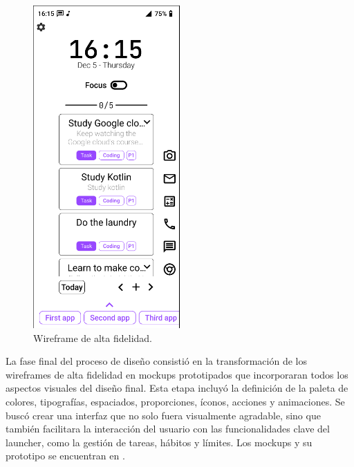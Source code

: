\begin{figure}[H]
  \caption{Wireframe de alta fidelidad.}
  \label{fig:wireframe_alta_fidelidad}
  \includegraphics[width=0.5\textwidth]{Figuras/wireframe_alta_fidelidad.png}
  \centering
\end{figure}

La fase final del proceso de diseño consistió en la transformación de los wireframes de alta fidelidad en mockups prototipados que incorporaran todos los aspectos visuales del diseño final. Esta etapa incluyó la definición de la paleta de colores, tipografías, espaciados, proporciones, íconos, acciones y animaciones. Se buscó crear una interfaz que no solo fuera visualmente agradable, sino que también facilitara la interacción del usuario con las funcionalidades clave del launcher, como la gestión de tareas, hábitos y límites. Los mockups y su prototipo se encuentran en \cite{Mockups}.

